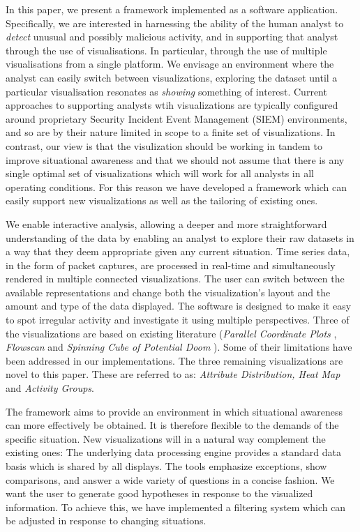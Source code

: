 In this paper, we present a framework implemented as a software application. Specifically, we are
interested in harnessing the ability of the human analyst to \textit{detect} unusual and possibly
malicious activity, and in supporting that analyst through the use of visualisations. In particular,
through the use of multiple visualisations from a single platform. We envisage an environment where
the analyst can easily switch between visualizations, exploring the dataset until a particular
visualisation resonates as \textit{showing} something of interest. Current approaches to supporting
analysts wtih visualizations are typically configured around proprietary Security Incident Event
Management (SIEM) environments, and so are by their nature limited in scope to a finite set of
visualizations. In contrast, our view is that the visulization should be working in tandem to
improve situational awareness and that we should not assume that there is any single optimal set of
visualizations which will work for all analysts in all operating conditions. For this reason we have
developed a framework which can easily support new visualizations as well as the tailoring of
existing ones.

We enable interactive analysis, allowing a deeper and more straightforward understanding of the data
by enabling an analyst to explore their raw datasets in a way that they deem appropriate given any
current situation. Time series data, in the form of packet captures, are processed in real-time and
simultaneously rendered in multiple connected visualizations. The user can switch between the
available representations and change both the visualization's layout and the amount and
type of the data displayed. The software is designed to make it easy to spot irregular
activity and investigate it using multiple perspectives. Three of the visualizations are based on
existing literature (\textit{Parallel Coordinate Plots} \cite{inselberg1985plane}, \textit{Flowscan}
\cite{plonka2000flowscan} and \textit{Spinning Cube of Potential Doom} \cite{lau2004spinning}). Some
of their limitations have been addressed in our implementations. The three remaining visualizations
are novel to this paper. These are referred to as: \textit{Attribute Distribution, Heat Map} and
\textit{Activity Groups}.

The framework aims to provide an environment in which situational awareness can more effectively be
obtained. It is therefore flexible to the demands of the specific situation. New visualizations will
in a natural way complement the existing ones: The underlying data processing engine provides a
standard data basis which is shared by all displays. The tools emphasize exceptions, show
comparisons, and answer a wide variety of questions in a concise fashion. We want the user to
generate good hypotheses in response to the visualized information. To achieve this, we have
implemented a filtering system which can be adjusted in response to changing situations. 

